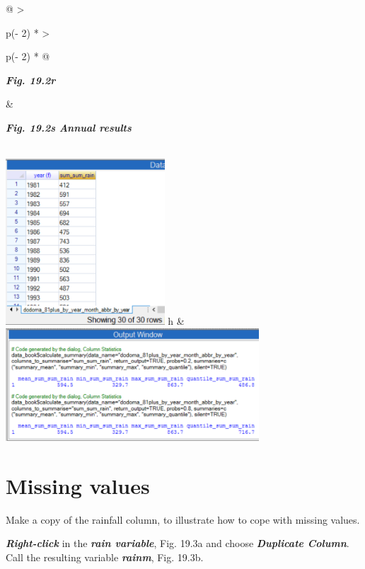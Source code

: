 \documentclass[
  letterpaper,
  DIV=11,
  numbers=noendperiod]{scrreprt}
\begin{document}
\begin{longtable}[]{@{}
  >{\raggedright\arraybackslash}p{(\columnwidth - 2\tabcolsep) * }
  >{\raggedright\arraybackslash}p{(\columnwidth - 2\tabcolsep) * }@{}}
\toprule\noalign{}
\begin{minipage}[b]{\linewidth}\raggedright
\textbf{\emph{Fig. 19.2r}}
\end{minipage} & \begin{minipage}[b]{\linewidth}\raggedright
\textbf{\emph{Fig. 19.2s Annual results}}
\end{minipage} \\
\midrule\noalign{}
\endhead
\bottomrule\noalign{}
\endlastfoot
\includegraphics[width=2.3396in,height=2.44532in]{figures/Fig19.2r.png}
h &
\includegraphics[width=3.72906in,height=\textheight]{figures/Fig19.2s.png} \\
\end{longtable}

\section{Missing values}\label{missing-values}

Make a copy of the rainfall column, to illustrate how to cope with
missing values.

\textbf{\emph{Right-click}} in the \textbf{\emph{rain variable}}, Fig.
19.3a and choose \textbf{\emph{Duplicate Column}}. Call the resulting
variable \textbf{\emph{rainm}}, Fig. 19.3b.
\end{document}
